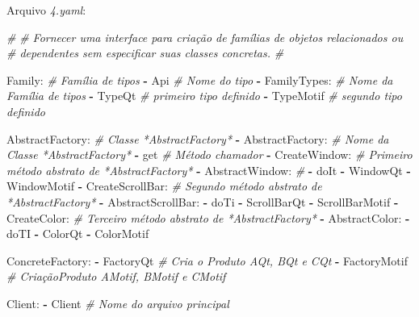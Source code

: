 \documentclass[]{article}
\newenvironment{Shaded}{}{}
\newcommand{\KeywordTok}[1]{\textcolor[rgb]{0.00,0.44,0.13}{\textbf{{#1}}}}
\newcommand{\CommentTok}[1]{\textcolor[rgb]{0.38,0.63,0.69}{\textit{{#1}}}}
\newcommand{\FunctionTok}[1]{\textcolor[rgb]{0.02,0.16,0.49}{{#1}}}
\newcommand{\NormalTok}[1]{{#1}}
\begin{document}
\clearpage
Arquivo \emph{4.yaml}:

\begin{Shaded}
\begin{Highlighting}[]
\CommentTok{#}
\CommentTok{# Fornecer uma interface para criação de famílias de objetos relacionados ou}
\CommentTok{# dependentes sem especificar suas classes concretas.}
\CommentTok{#}

\FunctionTok{Family:}                      \CommentTok{# Família de tipos}
\KeywordTok{-} \NormalTok{Api                        }\CommentTok{# Nome do tipo}
\KeywordTok{-} \FunctionTok{FamilyTypes:}               \CommentTok{# Nome da Família de tipos}
    \KeywordTok{-} \NormalTok{TypeQt                 }\CommentTok{# primeiro tipo definido}
    \KeywordTok{-} \NormalTok{TypeMotif              }\CommentTok{# segundo tipo definido}

\FunctionTok{AbstractFactory:}             \CommentTok{# Classe *AbstractFactory* }
\KeywordTok{-} \FunctionTok{AbstractFactory:}           \CommentTok{# Nome da Classe *AbstractFactory*}
    \KeywordTok{-} \NormalTok{get                    }\CommentTok{# Método chamador}
    \KeywordTok{-} \FunctionTok{CreateWindow:}          \CommentTok{# Primeiro método abstrato de *AbstractFactory*}
        \KeywordTok{-} \FunctionTok{AbstractWindow:}    \CommentTok{#}
            \KeywordTok{-} \NormalTok{doIt}
            \KeywordTok{-} \NormalTok{WindowQt}
            \KeywordTok{-} \NormalTok{WindowMotif}
    \KeywordTok{-} \FunctionTok{CreateScrollBar:}       \CommentTok{# Segundo método abstrato de *AbstractFactory*}
        \KeywordTok{-} \FunctionTok{AbstractScrollBar:}
            \KeywordTok{-} \NormalTok{doTi}
            \KeywordTok{-} \NormalTok{ScrollBarQt}
            \KeywordTok{-} \NormalTok{ScrollBarMotif}
    \KeywordTok{-} \FunctionTok{CreateColor:}           \CommentTok{# Terceiro método abstrato de *AbstractFactory*}
        \KeywordTok{-} \FunctionTok{AbstractColor:}
            \KeywordTok{-} \NormalTok{doTI}
            \KeywordTok{-} \NormalTok{ColorQt}
            \KeywordTok{-} \NormalTok{ColorMotif}

\FunctionTok{ConcreteFactory:}
\KeywordTok{-} \NormalTok{FactoryQt                  }\CommentTok{# Cria o Produto AQt, BQt e CQt}
\KeywordTok{-} \NormalTok{FactoryMotif               }\CommentTok{# CriaçãoProduto AMotif, BMotif e CMotif}

\FunctionTok{Client:}
\KeywordTok{-} \NormalTok{Client                     }\CommentTok{# Nome do arquivo principal}
\end{Highlighting}
\end{Shaded}
\end{document}
